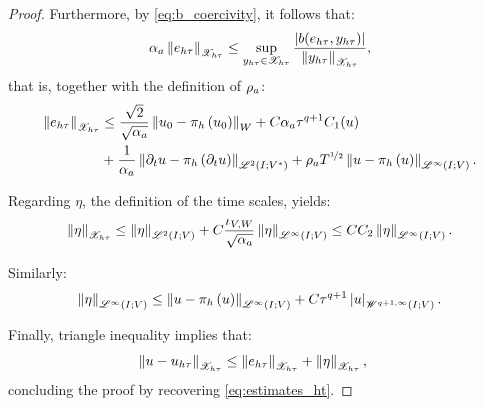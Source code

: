 \begin{proof}
    Furthermore, by \cref{eq:b_coercivity}, it follows that:
    \begin{align*}
        \alpha_{a} \left\lVert e_{h \tau} \right\rVert_{\mathscr{X}_{h \tau}} \leq \sup_{y_{h \tau} \in \mathscr{X}_{h \tau}} \frac{ \left\lvert b(e_{h \tau}, y_{h \tau}) \right\rvert }{\left\lVert y_{h \tau} \right\rVert_{\mathscr{X}_{h \tau}}},
    \end{align*}
    that is, together with the definition of $\rho_{a}$:
    \begin{align*}
        \left\lVert e_{h \tau} \right\rVert_{\mathscr{X}_{h \tau}} &\leq \frac{\sqrt{2}}{\sqrt{\alpha_{a}}} \left\lVert  u_0 - \pi_h \left( u_0 \right)  \right\rVert_W + C \alpha_{a} \tau^{q + 1} C_1(u) \\
        &+ \frac{1}{\alpha_{a}} \left\lVert  \partial_t u - \pi_h \left( \partial_t u \right)  \right\rVert_{\mathscr{L}^{2}(I; V^*)} + \rho_{a} T^{\nicefrac12} \left\lVert  u - \pi_h \left( u \right)  \right\rVert_{\mathscr{L}^{\infty}(I; V)}.
    \end{align*}

    Regarding $\eta$, the definition of the time scales, yields:
    \begin{align*}
        \left\lVert  \eta  \right\rVert_{\mathscr{X}_{h \tau}} \leq \left\lVert  \eta  \right\rVert_{\mathscr{L}^{2}(I; V)} + C \frac{\iota_{V, W}}{\sqrt{\alpha_{a}}} \left\lVert  \eta  \right\rVert_{\mathscr{L}^{\infty}(I; V)} \leq C C_2 \left\lVert  \eta  \right\rVert_{\mathscr{L}^{\infty}(I; V)}.
    \end{align*}

    Similarly:
    \begin{align*}
        \left\lVert  \eta  \right\rVert_{\mathscr{L}^{\infty}(I; V)} \leq \left\lVert  u - \pi_h \left( u \right)  \right\rVert_{\mathscr{L}^{\infty}(I; V)} + C \tau^{q + 1} \left\lvert u \right\rvert_{\mathscr{W}^{q + 1, \infty}(I; V)}.
    \end{align*}

    Finally, triangle inequality implies that:
    \begin{align*}
        \left\lVert u - u_{h \tau} \right\rVert_{\mathscr{X}_{h \tau}} &\leq \left\lVert e_{h \tau} \right\rVert_{\mathscr{X}_{h \tau}} + \left\lVert  \eta  \right\rVert_{\mathscr{X}_{h \tau}},
    \end{align*}
    concluding the proof by recovering \cref{eq:estimates_ht}.
\end{proof}